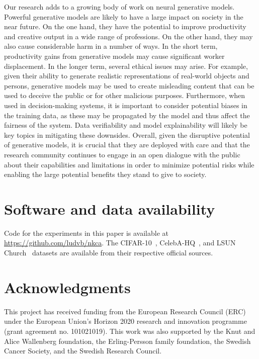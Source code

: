 \documentclass[10pt,twocolumn,letterpaper]{article}
\begin{document}
Our research adds to a growing body of work on neural generative models.
Powerful generative models are likely to have a large impact on society in the near future.
On the one hand, they have the potential to improve productivity and creative output in a wide range of professions.
On the other hand, they may also cause considerable harm in a number of ways.
In the short term, productivity gains from generative models may cause significant worker displacement.
In the longer term, several ethical issues may arise.
For example, given their ability to generate realistic representations of real-world objects and persons, generative models may be used to create misleading content that can be used to deceive the public or for other malicious purposes.
Furthermore, when used in decision-making systems, it is important to consider potential biases in the training data, as these may be propagated by the model and thus affect the fairness of the system.
Data verifiability and model explainability will likely be key topics in mitigating these downsides.
Overall, given the disruptive potential of generative models, it is crucial that they are deployed with care and that the research community continues to engage in an open dialogue with the public about their capabilities and limitations in order to minimize potential risks while enabling the large potential benefits they stand to give to society.


\section*{Software and data availability}

Code for the experiments in this paper is available at \url{https://github.com/ludvb/nkca}.
The CIFAR-10~\cite{krizhevsky2009learning}, CelebA-HQ~\cite{karras17progressive}, and LSUN Church~\cite{yu15lsun} datasets are available from their respective official sources.


\section*{Acknowledgments}

This project has received funding from the European Research Council (ERC) under the European Union’s Horizon 2020 research and innovation programme (grant agreement no. 101021019). This work was also supported by the Knut and Alice Wallenberg foundation, the Erling-Persson family foundation, the Swedish Cancer Society, and the Swedish Research Council.
\end{document}
